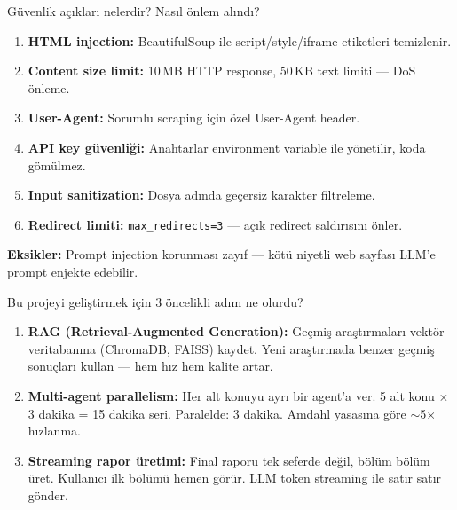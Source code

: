 \begin{mulakat}{G\"{u}venlik a\c{c}{\i}klar{\i} nelerdir? Nas{\i}l \"{o}nlem al{\i}nd{\i}?}
\begin{enumerate}
  \item \textbf{HTML injection:} BeautifulSoup ile script/style/iframe etiketleri temizlenir.
  \item \textbf{Content size limit:} 10\,MB HTTP response, 50\,KB text limiti --- DoS \"{o}nleme.
  \item \textbf{User-Agent:} Sorumlu scraping i\c{c}in \"{o}zel User-Agent header.
  \item \textbf{API key g\"{u}venli\u{g}i:} Anahtarlar environment variable ile y\"{o}netilir, koda g\"{o}m\"{u}lmez.
  \item \textbf{Input sanitization:} Dosya ad{\i}nda ge\c{c}ersiz karakter filtreleme.
  \item \textbf{Redirect limiti:} \texttt{max\_redirects=3} --- a\c{c}{\i}k redirect sald{\i}r{\i}s{\i}n{\i} \"{o}nler.
\end{enumerate}

\textbf{Eksikler:} Prompt injection korunmas{\i} zay{\i}f --- k\"{o}t\"{u} niyetli web sayfas{\i} LLM'e prompt enjekte edebilir.
\end{mulakat}

\begin{mulakat}{Bu projeyi geli\c{s}tirmek i\c{c}in 3 \"{o}ncelikli ad{\i}m ne olurdu?}
\begin{enumerate}
  \item \textbf{RAG (Retrieval-Augmented Generation):} Ge\c{c}mi\c{s} ara\c{s}t{\i}rmalar{\i} vekt\"{o}r veritaban{\i}na (ChromaDB, FAISS) kaydet. Yeni ara\c{s}t{\i}rmada benzer ge\c{c}mi\c{s} sonu\c{c}lar{\i} kullan --- hem h{\i}z hem kalite artar.

  \item \textbf{Multi-agent parallelism:} Her alt konuyu ayr{\i} bir agent'a ver. 5 alt konu $\times$ 3 dakika = 15 dakika seri. Paralelde: 3 dakika. Amdahl yasas{\i}na g\"{o}re $\sim$5$\times$ h{\i}zlanma.

  \item \textbf{Streaming rapor \"{u}retimi:} Final raporu tek seferde de\u{g}il, b\"{o}l\"{u}m b\"{o}l\"{u}m \"{u}ret. Kullan{\i}c{\i} ilk b\"{o}l\"{u}m\"{u} hemen g\"{o}r\"{u}r. LLM token streaming ile sat{\i}r sat{\i}r g\"{o}nder.
\end{enumerate}
\end{mulakat}
